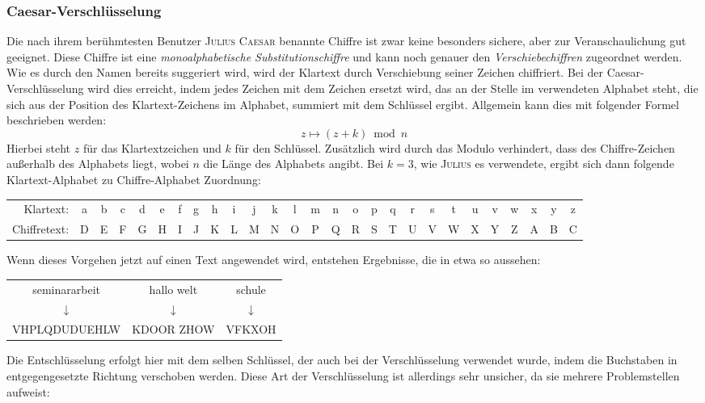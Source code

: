 \documentclass{scrarticle}
\newcommand{\person}[1]{\textsc{#1}}
\begin{document}
    \subsubsection{Caesar-Verschlüsselung}
    Die nach ihrem berühmtesten Benutzer \person{Julius Caesar} benannte Chiffre ist zwar keine besonders sichere, aber zur Veranschaulichung gut geeignet. Diese Chiffre ist eine \emph{monoalphabetische Substitutionschiffre} und kann noch genauer den \emph{Verschiebechiffren} zugeordnet werden. Wie es durch den Namen bereits suggeriert wird, wird der Klartext durch Verschiebung seiner Zeichen chiffriert. Bei der Caesar-Verschlüsselung wird dies erreicht, indem jedes Zeichen mit dem Zeichen ersetzt wird, das an der Stelle im verwendeten Alphabet steht, die sich aus der Position des Klartext-Zeichens im Alphabet, summiert mit dem Schlüssel ergibt. Allgemein kann dies mit folgender Formel beschrieben werden:
    \begin{equation}
        z \mapsto (z+k) \bmod n
    \end{equation}
    Hierbei steht $z$ für das Klartextzeichen und $k$ für den Schlüssel. Zusätzlich wird durch das Modulo verhindert, dass des Chiffre-Zeichen außerhalb des Alphabets liegt, wobei $n$ die Länge des Alphabets angibt. Bei $k=3$, wie \person{Julius} es verwendete, ergibt sich dann folgende Klartext-Alphabet zu Chiffre-Alphabet Zuordnung:
    \begin{center}
        \begin{tabularx}{\textwidth}{r*{26}{C}}
            Klartext: &a&b&c&d&e&f&g&h&i&j&k&l&m&n&o&p&q&r&s&t&u&v&w&x&y&z\\
            Chiffretext: &D&E&F&G&H&I&J&K&L&M&N&O&P&Q&R&S&T&U&V&W&X&Y&Z&A&B&C       
        \end{tabularx}
    \end{center}
    Wenn dieses Vorgehen jetzt auf einen Text angewendet wird, entstehen Ergebnisse, die in etwa so aussehen:
    \begin{center}
        \begin{tabular}{ccc}
            seminararbeit & hallo welt & schule \\
            $\downarrow$ & 	$\downarrow$ & 	$\downarrow$\\
            VHPLQDUDUEHLW & KDOOR ZHOW & VFKXOH
        \end{tabular}
    \end{center}
    Die Entschlüsselung erfolgt hier mit dem selben Schlüssel, der auch bei der Verschlüsselung verwendet wurde, indem die Buchstaben in entgegengesetzte Richtung verschoben werden. Diese Art der Verschlüsselung ist allerdings sehr unsicher, da sie mehrere Problemstellen aufweist:
\end{document}

